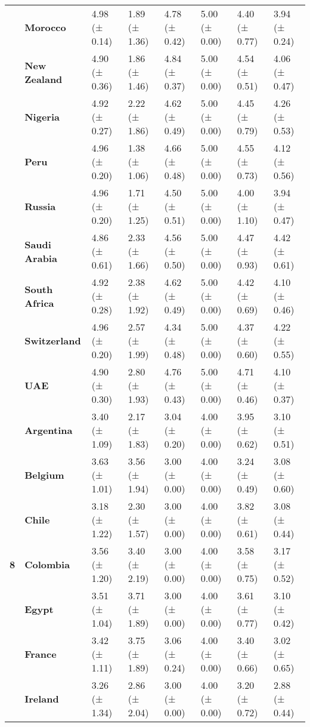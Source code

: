 \begin{longtable}{llllllll}
\textbf{} & \textbf{Morocco} & 4.98 (± 0.14) & 1.89 (± 1.36) & 4.78 (± 0.42) & 5.00 (± 0.00) & 4.40 (± 0.77) & 3.94 (± 0.24) \\
\textbf{} & \textbf{New Zealand} & 4.90 (± 0.36) & 1.86 (± 1.46) & 4.84 (± 0.37) & 5.00 (± 0.00) & 4.54 (± 0.51) & 4.06 (± 0.47) \\
\textbf{} & \textbf{Nigeria} & 4.92 (± 0.27) & 2.22 (± 1.86) & 4.62 (± 0.49) & 5.00 (± 0.00) & 4.45 (± 0.79) & 4.26 (± 0.53) \\
\textbf{} & \textbf{Peru} & 4.96 (± 0.20) & 1.38 (± 1.06) & 4.66 (± 0.48) & 5.00 (± 0.00) & 4.55 (± 0.73) & 4.12 (± 0.56) \\
\textbf{} & \textbf{Russia} & 4.96 (± 0.20) & 1.71 (± 1.25) & 4.50 (± 0.51) & 5.00 (± 0.00) & 4.00 (± 1.10) & 3.94 (± 0.47) \\
\textbf{} & \textbf{Saudi Arabia} & 4.86 (± 0.61) & 2.33 (± 1.66) & 4.56 (± 0.50) & 5.00 (± 0.00) & 4.47 (± 0.93) & 4.42 (± 0.61) \\
\textbf{} & \textbf{South Africa} & 4.92 (± 0.28) & 2.38 (± 1.92) & 4.62 (± 0.49) & 5.00 (± 0.00) & 4.42 (± 0.69) & 4.10 (± 0.46) \\
\textbf{} & \textbf{Switzerland} & 4.96 (± 0.20) & 2.57 (± 1.99) & 4.34 (± 0.48) & 5.00 (± 0.00) & 4.37 (± 0.60) & 4.22 (± 0.55) \\
\textbf{} & \textbf{UAE} & 4.90 (± 0.30) & 2.80 (± 1.93) & 4.76 (± 0.43) & 5.00 (± 0.00) & 4.71 (± 0.46) & 4.10 (± 0.37) \\
\cline{1-8}
\multirow[t]{19}{*}{\textbf{8}} & \textbf{Argentina} & 3.40 (± 1.09) & 2.17 (± 1.83) & 3.04 (± 0.20) & 4.00 (± 0.00) & 3.95 (± 0.62) & 3.10 (± 0.51) \\
\textbf{} & \textbf{Belgium} & 3.63 (± 1.01) & 3.56 (± 1.94) & 3.00 (± 0.00) & 4.00 (± 0.00) & 3.24 (± 0.49) & 3.08 (± 0.60) \\
\textbf{} & \textbf{Chile} & 3.18 (± 1.22) & 2.30 (± 1.57) & 3.00 (± 0.00) & 4.00 (± 0.00) & 3.82 (± 0.61) & 3.08 (± 0.44) \\
\textbf{} & \textbf{Colombia} & 3.56 (± 1.20) & 3.40 (± 2.19) & 3.00 (± 0.00) & 4.00 (± 0.00) & 3.58 (± 0.75) & 3.17 (± 0.52) \\
\textbf{} & \textbf{Egypt} & 3.51 (± 1.04) & 3.71 (± 1.89) & 3.00 (± 0.00) & 4.00 (± 0.00) & 3.61 (± 0.77) & 3.10 (± 0.42) \\
\textbf{} & \textbf{France} & 3.42 (± 1.11) & 3.75 (± 1.89) & 3.06 (± 0.24) & 4.00 (± 0.00) & 3.40 (± 0.66) & 3.02 (± 0.65) \\
\textbf{} & \textbf{Ireland} & 3.26 (± 1.34) & 2.86 (± 2.04) & 3.00 (± 0.00) & 4.00 (± 0.00) & 3.20 (± 0.72) & 2.88 (± 0.44) \\

\end{longtable}
